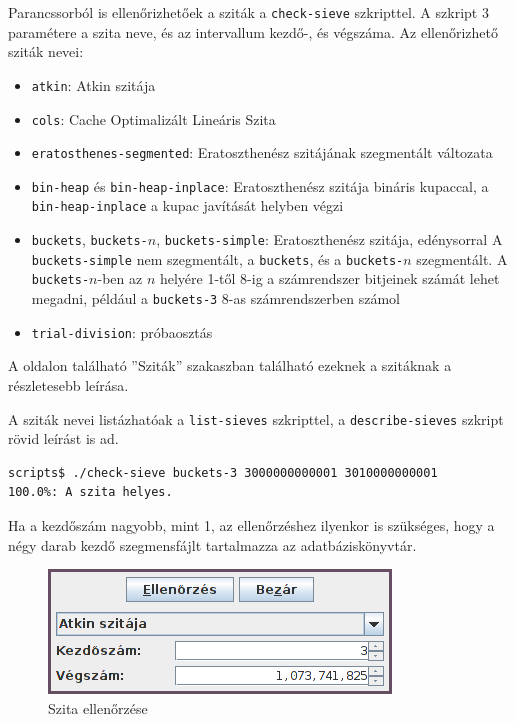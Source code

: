 Parancssorból is ellenőrizhetőek a sziták a \texttt{check-sieve} szkripttel.
A szkript 3 paramétere a szita neve, és az intervallum kezdő-, és végszáma.
Az ellenőrizhető sziták nevei:
\begin{itemize}
\item \texttt{atkin}: Atkin szitája\cite{atkin}
\item \texttt{cols}: Cache Optimalizált Lineáris Szita\cite{cols}
\item \texttt{eratosthenes-segmented}: Eratoszthenész szitájának szegmentált változata
\item \texttt{bin-heap} és \texttt{bin-heap-inplace}: Eratoszthenész szitája bináris kupaccal,
	a \texttt{bin-heap-inplace} a kupac javítását helyben végzi
\item \texttt{buckets}, \texttt{buckets-}$n$, \texttt{buckets-simple}: Eratoszthenész szitája, edénysorral
	A \texttt{buckets-simple} nem szegmentált, a \texttt{buckets}, és a \texttt{buckets-}$n$ szegmentált.
	A \texttt{buckets-}$n$-ben az $n$ helyére 1-től 8-ig a számrendszer bitjeinek számát lehet megadni,
	például a \texttt{buckets-3} 8-as számrendszerben számol
\item \texttt{trial-division}: próbaosztás
\end{itemize}

A \pageref{sec:szitak} oldalon található ''Sziták'' szakaszban található ezeknek a szitáknak a részletesebb leírása.

A sziták nevei listázhatóak a \texttt{list-sieves} szkripttel, a \texttt{describe-sieves} szkript rövid leírást is ad.

\begin{lstlisting}[language=bash]
scripts$ ./check-sieve buckets-3 3000000000001 3010000000001
100.0%: A szita helyes.
\end{lstlisting}

Ha a kezdőszám nagyobb, mint 1, az ellenőrzéshez ilyenkor is szükséges, hogy a négy darab kezdő szegmensfájlt tartalmazza az adatbáziskönyvtár.

\begin{figure}[H]
\caption{Szita ellenőrzése}
\centering
\includegraphics[scale=1]{check-sieve.png}
\end{figure}

